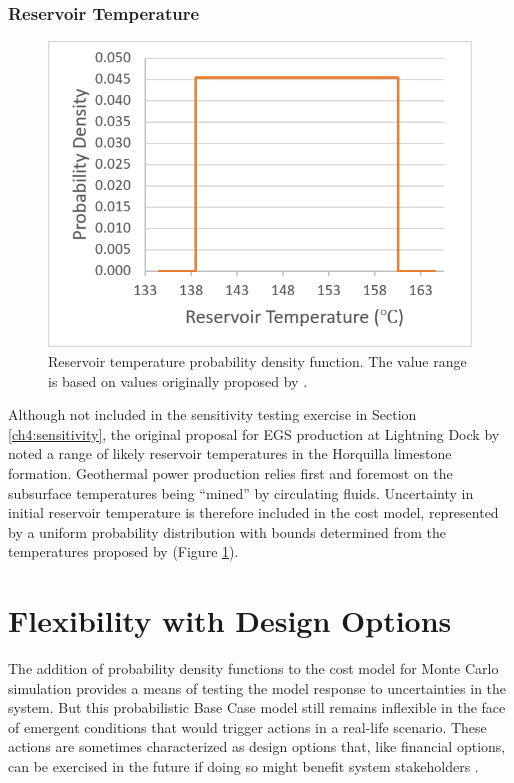 \subsubsection{Reservoir Temperature}\label{cm4:prob_temp}
\begin{figure} %
\centering
\includegraphics[scale=0.45]{templates/images/Figure-Reservoir_Temp_PDF.png}
\singlespacing
\caption[Reservoir temperature PDF]{Reservoir temperature probability density function. The value range is based on values originally proposed by \protect\citet{schochet_development_2001}.}
\label{fig:cm_temp_pdf}
\end{figure}
Although not included in the sensitivity testing exercise in Section \ref{ch4:sensitivity}, the original proposal for EGS production at Lightning Dock by \citet{schochet_development_2001} noted a range of likely reservoir temperatures in the Horquilla limestone formation. Geothermal power production relies first and foremost on the subsurface temperatures being ``mined'' by circulating fluids. Uncertainty in initial reservoir temperature is therefore included in the cost model, represented by a uniform probability distribution with bounds determined from the temperatures proposed by \citet{schochet_development_2001} (Figure \ref{fig:cm_temp_pdf}).

\section{Flexibility with Design Options}\label{ch4:flex_design_options}
The addition of probability density functions to the cost model for Monte Carlo simulation provides a means of testing the model response to uncertainties in the system. But this probabilistic Base Case model still remains inflexible in the face of emergent conditions that would trigger actions in a real-life scenario. These actions are sometimes characterized as design options that, like financial options, can be exercised in the future if doing so might benefit system stakeholders \citep[p.\ 270-272]{de_neufville_flexibility_2011}.


